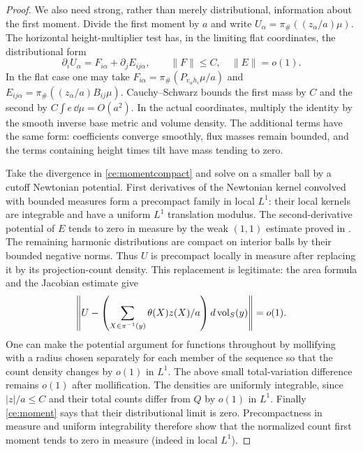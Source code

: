 \begin{proof}
We also need strong, rather than merely distributional, information
about the first moment.  Divide the first moment by $a$ and write
$U_\alpha=\pi_\#((z_\alpha/a)\mu)$.  The horizontal height-multiplier
test has, in the limiting flat coordinates, the distributional form
\begin{equation}
 \label{ce:momentcompact}
 \partial_iU_\alpha=F_{i\alpha}
                          +\partial_jE_{ij\alpha},
 \qquad \|F\|\le C,\quad \|E\|=o(1).
\end{equation}
In the flat case one may take
$F_{i\alpha}=\pi_\#(P_{v_\alpha h_i}\mu/a)$ and
$E_{ij\alpha}=\pi_\#((z_\alpha/a)B_{ij}\mu)$.
Cauchy--Schwarz bounds the first mass by $C$ and the second by
$C\int e\,\dd\mu=O(a^2)$.  In the actual coordinates, multiply
the identity by the smooth inverse base metric and volume density.
The additional terms have the same form: coefficients converge
smoothly, flux masses remain bounded, and the terms containing height
times tilt have mass tending to zero.

Take the divergence in \eqref{ce:momentcompact} and solve on a smaller
ball by a cutoff Newtonian potential.  First derivatives of the
Newtonian kernel convolved with bounded measures form a precompact
family in local $L^1$: their local kernels are integrable and have a
uniform $L^1$ translation modulus.  The second-derivative potential
of $E$ tends to zero in measure by the weak $(1,1)$ estimate proved
in .  The remaining harmonic
distributions are compact on interior balls by their bounded negative
norms.  Thus $U$ is precompact locally in measure after replacing it
by its projection-count density.  This replacement is legitimate:
the area formula and the Jacobian estimate give
\[
 \left\|U-\left(\sum_{X\in\pi^{-1}(y)}
                  \theta(X)z(X)/a\right)\mathop{}\!d\operatorname{vol}_S(y)\right\|
       =o(1).
\]
One can make the potential argument for functions throughout by
mollifying with a radius chosen separately for each member of the
sequence so that the count density changes by $o(1)$ in $L^1$.
The above small total-variation difference remains $o(1)$ after
mollification.  The densities are uniformly integrable, since
$|z|/a\le C$ and their total counts differ from $Q$ by $o(1)$ in
$L^1$.  Finally \eqref{ce:moment} says that their distributional
limit is zero.  Precompactness in measure and uniform integrability
therefore show that the normalized count first moment tends to zero
in measure (indeed in local $L^1$).


\end{proof}
